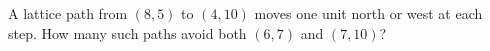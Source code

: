 A lattice path from $(8,5)$ to $(4,10)$ moves one unit north or west at each step. How many such paths avoid both $(6,7)$ and $(7,10)$?
